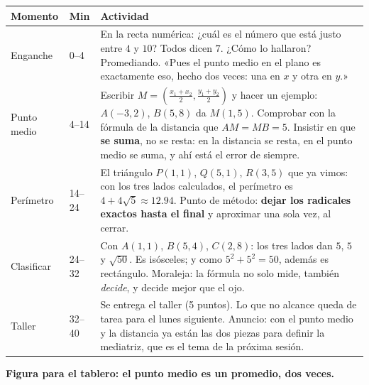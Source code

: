 \documentclass[11pt]{article}
\begin{document}
\begin{center}
{\renewcommand{\arraystretch}{1.3}
\begin{tabularx}{\linewidth}{@{}l l X@{}}
  \toprule
  \textbf{Momento} & \textbf{Min} & \textbf{Actividad}\\
  \midrule
  Enganche & 0--4 & En la recta numérica: ¿cuál es el número que está justo entre $4$ y $10$?
    Todos dicen $7$. ¿Cómo lo hallaron? Promediando. «Pues el punto medio en el plano es
    exactamente eso, hecho dos veces: una en $x$ y otra en $y$.»\\
  Punto medio & 4--14 & Escribir $M = \left(\frac{x_1+x_2}{2}, \frac{y_1+y_2}{2}\right)$ y
    hacer un ejemplo: $A(-3,2)$, $B(5,8)$ da $M(1,5)$. Comprobar con la fórmula de la
    distancia que $AM = MB = 5$. Insistir en que \textbf{se suma}, no se resta: en la distancia
    se resta, en el punto medio se suma, y ahí está el error de siempre.\\
  Perímetro & 14--24 & El triángulo $P(1,1)$, $Q(5,1)$, $R(3,5)$ que ya vimos: con los tres
    lados calculados, el perímetro es $4 + 4\sqrt{5} \approx \num{12,94}$. Punto de método:
    \textbf{dejar los radicales exactos hasta el final} y aproximar una sola vez, al cerrar.\\
  Clasificar & 24--32 & Con $A(1,1)$, $B(5,4)$, $C(2,8)$: los tres lados dan $5$, $5$ y
    $\sqrt{50}$. Es isósceles; y como $5^2 + 5^2 = 50$, además es rectángulo. Moraleja: la
    fórmula no solo mide, también \emph{decide}, y decide mejor que el ojo.\\
  Taller & 32--40 & Se entrega el taller (5 puntos). Lo que no alcance queda de tarea para el
    lunes siguiente. Anuncio: con el punto medio y la distancia ya están las dos piezas para
    definir la mediatriz, que es el tema de la próxima sesión.\\
  \bottomrule
\end{tabularx}}
\end{center}

\textbf{Figura para el tablero: el punto medio es un promedio, dos veces.}

\begin{center}
\end{center}
\end{document}
